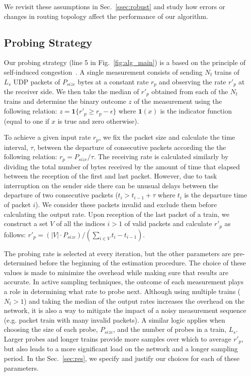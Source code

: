 \documentclass[final,5p,times,twocolumn]{elsarticle}
\begin{document}
We revisit these assumptions in Sec.~\ref{ssec:robust} and study how errors or changes in routing topology affect the performance of our algorithm.			
	
\subsection{Probing Strategy}

Our probing strategy (line 5 in Fig.~\ref{fig:alg_main}) is a based on the principle of self-induced congestion~\cite{rib:03}.  A single measurement consists of sending $N_t$ trains of $L_s$ UDP packets of $P_{size}$ bytes at a constant rate $r_p$ and observing the rate $r'_p$ at the receiver side.  We then take the median of $r'_p$ obtained from each of the $N_t$ trains and determine the binary outcome $z$ of the measurement using the following relation: $z = \mathbf{1}\{r'_p \geq r_p-\epsilon\}$ where $\mathbf{1}(x)$ is the indicator function (equal to one if $x$ is true and zero otherwise).  

To achieve a given input rate $r_p$, we fix the packet size and calculate the time interval, $\tau$, between the departure of consecutive packets according the the following relation: $r_p = P_{size}/\tau$.  The receiving rate is calculated similarly by dividing the total number of bytes received by the amount of time that elapsed between the reception of the first and last packet. However, due to task interruption on the sender side there can be unusual delays between the departure of two consecutive packets ($t_i > t_{i-1} + \tau$ where $t_i$ is the departure time of packet $i$).  We consider these packets invalid and exclude them before calculating the output rate.  Upon reception of the last packet of a train, we construct a set $V$ of all the indices $i>1$ of valid packets and calculate $r'_p$ as follows: $r'_p = (|V| \cdot P_{size})/\left(\sum_{i \in V} t_i - t_{i-1}\right)$.

The probing rate is selected at every iteration, but the other parameters are pre-determined before the beginning of the estimation procedure.  The choice of these values is made to minimize the overhead while making sure that results are accurate.  In active sampling techniques, the outcome of each measurement plays a role in determining what rate to probe next.  Although using multiple trains ($N_t > 1$) and taking the median of the output rates increases the overhead on the network, it is also a way to mitigate the impact of a  noisy measurement sequence (e.g. packet train with many invalid packets).  A similar logic applies when choosing the size of each probe, $P_{size}$, and the number of probes in a train, $L_s$.  Larger probes and longer trains provide more samples over which to average $r'_p$, but also leads to a more significant load on the network and a longer sampling period.  In the Sec.~\ref{sec:res}, we specify and justify our choices for each of these parameters.
\end{document}
